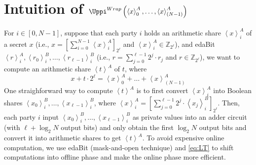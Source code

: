 \section{Intuition of $\Uppi^{Wrap}\left(\left\langle x\right\rangle_0^A, \ldots ,\left\langle x\right\rangle_{\left(N-1\right)}^A  \right) $}

For $i \in \left[0,N-1\right] $,
suppose that each party $i$ holds an arithmetic share $\left\langle x\right\rangle_i^A$ of a secret $x$ (i.e., $ x=\left[\sum_{i=0}^{N-1} \left\langle x\right\rangle_i^A \right]  _{2^\ell} $ and $ \left\langle x\right\rangle_i^A \in \mathbb{Z} _{2^{\ell}}$), and edaBit~\cite{escudero2020improved} $\left\langle r\right\rangle^A_i, \left\langle r_0\right\rangle^B_i,\ldots,  \left\langle r_{\ell-1}\right\rangle^B_i $ (i.e., $r=\sum_{j=0}^{\ell-1} 2^{j}\cdot r_j  $ and $r \in \mathbb{Z} _{2^{\ell}}$), we want to compute an arithmetic share $\left\langle t\right\rangle^A $ of $t$, where
\begin{equation}
    \label{eq:wrap}
    x + t\cdot 2^{\ell}   =\left\langle x\right\rangle_0^A+ \ldots +\left\langle x\right\rangle_{\left(N-1\right)}^A
\end{equation}
One straighforward way to compute $\left\langle t\right\rangle ^A$ is to first convert $\left\langle x\right\rangle_{i}^A$ into Boolean shares $\left\langle x_0\right\rangle_{i}^B,\ldots, \left\langle x_{\ell-1}\right\rangle_{i}^B$, where $\left\langle x\right\rangle_{i}^A=\left[\sum_{j = 0}^{\ell-1} 2^{j}\cdot \left\langle x_{j}\right\rangle_{i}^B\right]  _{2^{\ell}} $. Then, each party $i$ input $\left\langle x_0\right\rangle_{i}^B,\ldots, \left\langle x_{\ell-1}\right\rangle_{i}^B$ as private values into an adder circuit (with $\ell+\log_2 N$ output bits) and only obtain the first $\log_2 N$ output bits and convert it into arithmetic shares to get $\left\langle t\right\rangle ^A$. To avoid expensive online computation, we use edaBit (mask-and-open technique) and \autoref{eq:LT} to shift computations into offline phase and make the online phase more efficient.

